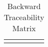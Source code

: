 \documentclass[Main]{subfiles}
\begin{document}
\begin{longtable}{l p{10.4cm} p{1.8cm} }
%
%
%
%
%
%
%
%
%
%
%
%
%
%
%
%
%
%
%
%
%
%

\\\hline
\caption{Backward Traceability Matrix}
\label{Tab:Backward}
\end{longtable}
\end{document}
